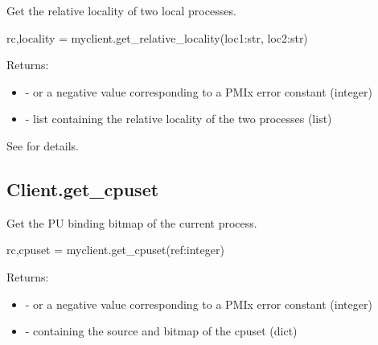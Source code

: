 \summary
Get the relative locality of two local processes.

\format

\pyspecificstart
\begin{codepar}
rc,locality = myclient.get_relative_locality(loc1:str, loc2:str)
\end{codepar}
\pyspecificend

\begin{arglist}
\end{arglist}


Returns:

\begin{itemize}
    \item {} -  or a negative value corresponding to a PMIx error constant (integer)
    \item {} -  list containing the relative locality of the two processes (list)
\end{itemize}

See  for details.


\subsection{Client.get_cpuset}

\summary
Get the \ac{PU} binding bitmap of the current process.

\format

\pyspecificstart
\begin{codepar}
rc,cpuset = myclient.get_cpuset(ref:integer)
\end{codepar}
\pyspecificend

\begin{arglist}
\end{arglist}


Returns:

\begin{itemize}
    \item {} -  or a negative value corresponding to a PMIx error constant (integer)
    \item {} -  containing the source and bitmap of the cpuset (dict)
\end{itemize}

